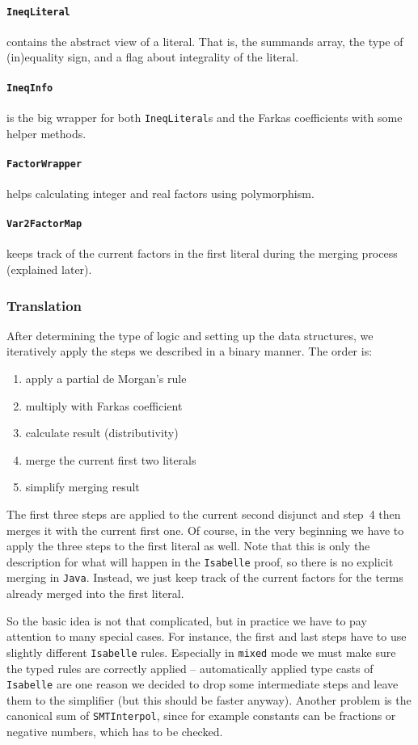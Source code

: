 \documentclass[10pt,a4paper]{article}
\newcommand{\si}{\texttt{SMTInterpol}\xspace}
\newcommand{\isa}{\texttt{Isabelle}\xspace}
\newcommand{\jav}{\texttt{Java}\xspace}
\newcommand{\ttt}{\texttt}
\begin{document}
\paragraph*{\ttt{IneqLiteral}} contains the abstract view of a literal. That is, the summands array, the type of (in)equality sign, and a flag about integrality of the literal.
%
\paragraph*{\ttt{IneqInfo}} is the big wrapper for both \ttt{IneqLiteral}s and the Farkas coefficients with some helper methods.
%
\paragraph*{\ttt{FactorWrapper}} helps calculating integer and real factors using polymorphism.
%
\paragraph*{\ttt{Var2FactorMap}} keeps track of the current factors in the first literal during the merging process (explained later).
%
\subsubsection*{Translation}
After determining the type of logic and setting up the data structures, we iteratively apply the steps we described in a binary manner. The order is:
\begin{enumerate}
	\item apply a partial de Morgan's rule
	\item multiply with Farkas coefficient
	\item calculate result (distributivity)
	\item merge the current first two literals
	\item simplify merging result
\end{enumerate}

The first three steps are applied to the current second disjunct and step~4 then merges it with the current first one. Of course, in the very beginning we have to apply the three steps to the first literal as well. Note that this is only the description for what will happen in the \isa proof, so there is no explicit merging in \jav. Instead, we just keep track of the current factors for the terms already merged into the first literal.

So the basic idea is not that complicated, but in practice we have to pay attention to many special cases. For instance, the first and last steps have to use slightly different \isa rules. Especially in \ttt{mixed} mode we must make sure the typed rules are correctly applied -- automatically applied type casts of \isa are one reason we decided to drop some intermediate steps and leave them to the simplifier (but this should be faster anyway). Another problem is the canonical sum of \si, since for example constants can be fractions or negative numbers, which has to be checked.
%
\end{document}
